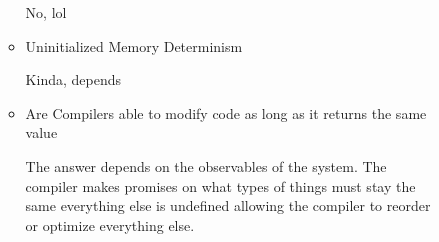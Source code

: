 \documentclass{report}
\begin{document}
\begin{description}
\begin{itemize}
\begin{itemize}
                        \begin{mdframed}
                            No, lol
                        \end{mdframed}
                    \item Uninitialized Memory Determinism
                        \begin{mdframed}
                            Kinda, depends
                        \end{mdframed}
                    \item Are Compilers able to modify code as long as it returns the same value
                        \begin{mdframed}
                            The answer depends on the observables of the system.
                            The compiler makes promises on what types of things must stay the same
                            everything else is undefined allowing the compiler to reorder or optimize
                            everything else.


\end{mdframed}
\end{itemize}
\end{itemize}
\end{description}
\end{document}
